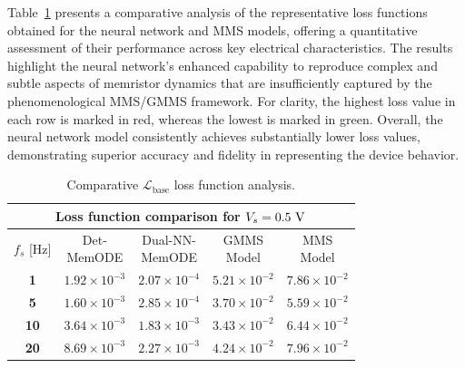 \documentclass[lettersize,journal]{IEEEtran}
\begin{document}
Table~\ref{tab:mms_comp} presents a comparative analysis of the representative loss functions obtained for the neural network and MMS models, offering a quantitative assessment of their performance across key electrical characteristics. The results highlight the neural network’s enhanced capability to reproduce complex and subtle aspects of memristor dynamics that are insufficiently captured by the phenomenological MMS/GMMS framework. For clarity, the highest loss value in each row is marked in red, whereas the lowest is marked in green. Overall, the neural network model consistently achieves substantially lower loss values, demonstrating superior accuracy and fidelity in representing the device behavior.

\begin{table}
  \caption{Comparative \(\mathcal{L}_{\mathrm{base}}\) loss function analysis.}
  \label{tab:mms_comp}
  \centering
  \begin{tabular}{c|cccc}
    \toprule
    \multicolumn{5}{c}{\textbf{Loss function comparison for \(V_s = 0.5 \rm \ V\)}}                                                                                        \\
    \midrule
    \(f_s\) [Hz] & \makecell{Det-                                                                                                                                          \\MemODE}             & \makecell{Dual-NN-                                                                                                             \\ MemODE}                 & \makecell{GMMS\\Model}             & \makecell{MMS\\Model}                                        \\
    \midrule
    \textbf{1}   & \(1.92 \times 10^{-3}\) & \color{ieeegreen} \bfseries \(2.07 \times 10^{-4}\) & \(5.21 \times 10^{-2}\) & \color{ieeered} \bfseries \(7.86 \times 10^{-2}\) \\
    \textbf{5}   & \(1.60 \times 10^{-3}\) & \color{ieeegreen} \bfseries \(2.85 \times 10^{-4}\) & \(3.70 \times 10^{-2}\) & \color{ieeered} \bfseries \(5.59 \times 10^{-2}\) \\
    \textbf{10}  & \(3.64 \times 10^{-3}\) & \color{ieeegreen} \bfseries \(1.83 \times 10^{-3}\) & \(3.43 \times 10^{-2}\) & \color{ieeered} \bfseries \(6.44 \times 10^{-2}\) \\
    \textbf{20}  & \(8.69 \times 10^{-3}\) & \color{ieeegreen} \bfseries \(2.27 \times 10^{-3}\) & \(4.24 \times 10^{-2}\) & \color{ieeered} \bfseries \(7.96 \times 10^{-2}\) \\

\end{tabular}
\end{table}
\end{document}
